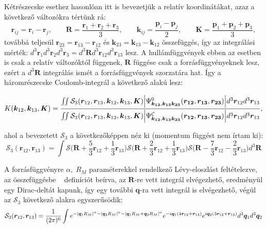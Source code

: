 \documentclass[11pt,a4paper]{article}
\numberwithin{equation}{subsection}
\numberwithin{figure}{section}
\begin{document}
Kétrészecske esethez hasonlóan itt is bevezetjük a relatív koordinátákat, azaz a következő változókra tértünk rá:
\begin{equation}
\bm{r}_{ij} = \bm{r}_i-\bm{r}_j,\;\;\;\;\;\;\;
\bm{R}=\frac{\bm{r}_1+\bm{r}_2+\bm{r}_3}{3},\;\;\;\;\;\;\;
\bm{k}_{ij}=\frac{\bm{p}_{i}-\bm{p}_{j}}{2},\;\;\;\;\;\;\;
\bm{K} = \frac{\bm{p}_1+\bm{p}_2+\bm{p}_3}{3},
\label{eq:CMF3}
\end{equation}
továbbá teljesül $\bm{r}_{23}=\bm{r}_{13}-\bm{r}_{12}$ és $\bm{k}_{23}=\bm{k}_{13}-\bm{k}_{12}$ összefüggés, így az integrálási mérték: $d^3 \bm{r}_1d^3 \bm{r}_2d^3 \bm{r}_3=d^3\bm{R} d^3\bm{r}_{12} d^3\bm{r}_{13}$ lesz. A hullámfüggvények ebben az esetben is csak a relatív változóktól függenek, $\bm{R}$ függése csak a forrásfüggvényeknek lesz, ezért a $d^3\bm{R}$ integrálás ismét a forrásfüggvények szorzatára hat. Így a háromrészecske Coulomb-integrál a következő alakú lesz:

\begin{equation}
K(\bm{k}_{12},\bm{k}_{13},\bm{K})=
\frac{
\iint
\mathcal{S}_{3}(\bm{r}_{12}, \bm{r}_{13}, \bm{k}_{12}, \bm{k}_{13}, \bm{K})
\abs{\Psi^{0}_{\bm{k_{12}},\bm{k_{13}}\bm{k_{23}}}(\bm{r_{12}},\bm{r_{13}},\bm{r_{23}})} d^3 \bm{r}_{12}d^3 \bm{r}_{13}
}{\iint
\mathcal{S}_{3}(\bm{r}_{12}, \bm{r}_{13}, \bm{k}_{12}, \bm{k}_{13}, \bm{K})
\abs{\Psi^{\mathcal{C}}_{\bm{k_{12}},\bm{k_{13}}\bm{k_{23}}}(\bm{r_{12}},\bm{r_{13}},\bm{r_{23}})} d^3 \bm{r}_{12}d^3 \bm{r}_{13}},
\label{eq:K3}
\end{equation}

ahol a bevezetett $\mathcal{S}_3$ a következőképpen néz ki (momentum függést nem írtam ki):
\begin{equation}
\mathcal{S}_{3}(\bm{r}_{12}, \bm{r}_{13}) =
\int 
\mathcal{S}\bigg(\bm{R}+\frac{5}{3}\bm{r}_{12}+\frac{1}{3}\bm{r}_{13}\bigg)
\mathcal{S}\bigg(\bm{R}+\frac{2}{3}\bm{r}_{12}+\frac{1}{3}\bm{r}_{13}\bigg)
\mathcal{S}\bigg(\bm{R}-\frac{7}{3}\bm{r}_{12}-\frac{2}{3}\bm{r}_{13}\bigg)
d^3\bm{R}
\end{equation}

A forrásfüggvényre $\alpha,\;R_M$ paraméterekkel rendelkező Lévy-eloszlást feltételezve, az összefüggésbe ~ definíciót beírva, az $\bm{R}$-re vett integrál elvégezhető, eredményül egy Dirac-deltát kapunk, így egy további $\bm{q}$-ra vett integrál is elvégezhető, végül az $\mathcal{S}_3$ következő alakra egyszerűsödik: 
\begin{equation}
\mathcal{S}_3(\bm{r}_{12}, \bm{r}_{13}) = \frac{1}{(2\pi)^6}
\int
e^{-\abs{\bm{q}_1R_M}^\alpha-\abs{\bm{q}_2R_M}^\alpha-\abs{\bm{q}_1R_M+\bm{q}_2R_M}^\alpha}
e^{-i\bm{q}_1(4\bm{r}_{12}+\bm{r}_{13})}
e^{i\bm{q}_2(3\bm{r}_{12}+\bm{r}_{13})}
d^3\bm{q}_1d^3\bm{q}_2
\label{eq:S3}
\end{equation}
\end{document}
